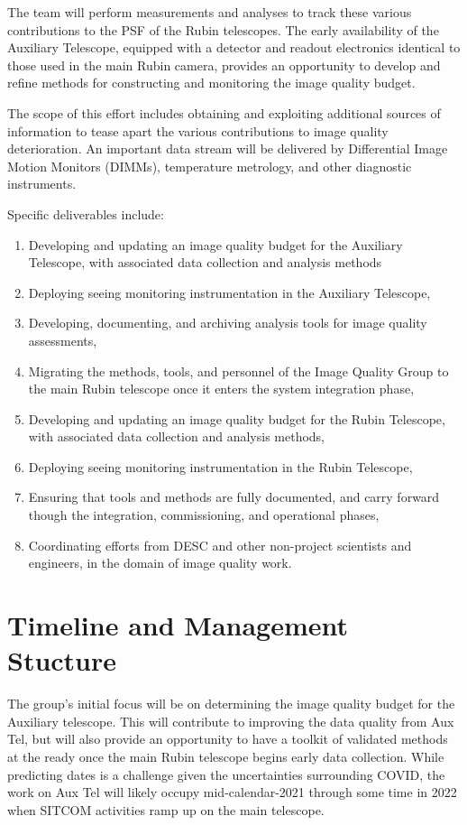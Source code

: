 \documentclass[SE,authoryear,toc]{lsstdoc}
\begin{document}
The team will perform measurements and analyses to track these various contributions to the PSF of the Rubin telescopes.
The early availability of the Auxiliary Telescope, equipped with a detector and readout electronics identical to those used in the main Rubin camera, provides an opportunity to develop and refine methods for constructing and monitoring the image quality budget.

The scope of this effort includes obtaining and exploiting additional sources of information to tease apart the various contributions to image quality deterioration.
An important data stream will be delivered by Differential Image Motion Monitors (DIMMs), temperature metrology, and other diagnostic instruments.

Specific deliverables include:
\begin{enumerate}
\item Developing and updating an image quality budget for the Auxiliary Telescope, with associated data collection and analysis methods
\item Deploying seeing monitoring instrumentation in the Auxiliary Telescope,
\item Developing, documenting, and archiving analysis tools for image quality assessments,
\item Migrating the methods, tools, and personnel of the Image Quality Group to the main Rubin telescope once it enters the system integration phase,
\item Developing and updating an image quality budget for the Rubin Telescope, with associated data collection and analysis methods,
\item Deploying seeing monitoring instrumentation in the Rubin Telescope,
\item Ensuring that tools and methods are fully documented, and carry forward though the integration, commissioning, and operational phases,
\item Coordinating efforts from DESC and other non-project scientists and engineers, in the domain of image quality work.
\end{enumerate}

\section{Timeline and Management Stucture}

The group's initial focus will be on determining the image quality budget for the Auxiliary telescope.
This will contribute to improving the data quality from Aux Tel, but will also provide an opportunity to have a toolkit of validated methods at the ready once the main Rubin telescope begins early data collection.
While predicting dates is a challenge given the uncertainties surrounding COVID, the work on Aux Tel will likely occupy mid-calendar-2021 through some time in 2022 when SITCOM activities ramp up on the main telescope.
\end{document}
